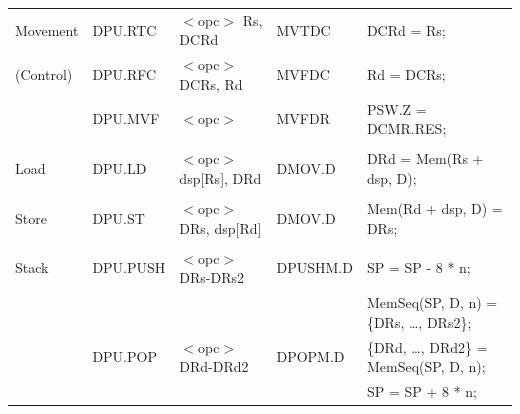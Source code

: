 \begin{table}
\begin{subtable}{\linewidth}
\begin{center}
\begin{tabular}{lllll}
Movement           & DPU.RTC           & $<$opc$>$ Rs, DCRd                    & MVTDC             & DCRd = Rs;                                                                    \\
(Control)          & DPU.RFC           & $<$opc$>$ DCRs, Rd                    & MVFDC             & Rd = DCRs;                                                                    \\
                   & DPU.MVF           & $<$opc$>$                             & MVFDR             & PSW.Z = DCMR.RES;                                                             \\
                   &                   &                                       &                   &                                                                               \\
Load               & DPU.LD            & $<$opc$>$ dsp[Rs], DRd                & DMOV.D            & DRd = Mem(Rs + dsp, D);                                                       \\
                   &                   &                                       &                   &                                                                               \\
Store              & DPU.ST            & $<$opc$>$ DRs, dsp[Rd]                & DMOV.D            & Mem(Rd + dsp, D) = DRs;                                                       \\
                   &                   &                                       &                   &                                                                               \\
Stack              & DPU.PUSH          & $<$opc$>$ DRs-DRs2                    & DPUSHM.D          & SP = SP - 8 * n;                                                              \\
                   &                   &                                       &                   & MemSeq(SP, D, n) = \{DRs, \ldots, DRs2\};                                     \\
                   & DPU.POP           & $<$opc$>$ DRd-DRd2                    & DPOPM.D           & \{DRd, \ldots, DRd2\} = MemSeq(SP, D, n);                                     \\
                   &                   &                                       &                   & SP = SP + 8 * n;                                                              \\

\end{tabular}
\end{center}
\end{subtable}
\end{table}

